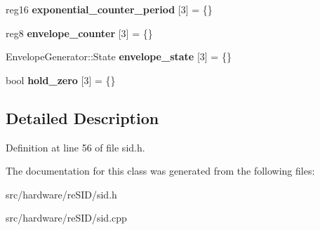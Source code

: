 \begin{DoxyCompactItemize}
\item 
\hypertarget{classSID2_1_1State_a20c37f3ceb79d9273b98ba0248137575}{reg16 {\bfseries exponential\-\_\-counter\-\_\-period} \mbox{[}3\mbox{]} = \{\}}\label{classSID2_1_1State_a20c37f3ceb79d9273b98ba0248137575}

\item 
\hypertarget{classSID2_1_1State_a6bf1b64e2cbb3e65e01f72c4313e16e3}{reg8 {\bfseries envelope\-\_\-counter} \mbox{[}3\mbox{]} = \{\}}\label{classSID2_1_1State_a6bf1b64e2cbb3e65e01f72c4313e16e3}

\item 
\hypertarget{classSID2_1_1State_ade48093e96aa20c8bb11593c09c91122}{Envelope\-Generator\-::\-State {\bfseries envelope\-\_\-state} \mbox{[}3\mbox{]} = \{\}}\label{classSID2_1_1State_ade48093e96aa20c8bb11593c09c91122}

\item 
\hypertarget{classSID2_1_1State_a1ce50784ed0368dac32b5db9d35cd21c}{bool {\bfseries hold\-\_\-zero} \mbox{[}3\mbox{]} = \{\}}\label{classSID2_1_1State_a1ce50784ed0368dac32b5db9d35cd21c}

\end{DoxyCompactItemize}


\subsection{Detailed Description}


Definition at line 56 of file sid.\-h.



The documentation for this class was generated from the following files\-:\begin{DoxyCompactItemize}
\item 
src/hardware/re\-S\-I\-D/sid.\-h\item 
src/hardware/re\-S\-I\-D/sid.\-cpp\end{DoxyCompactItemize}
